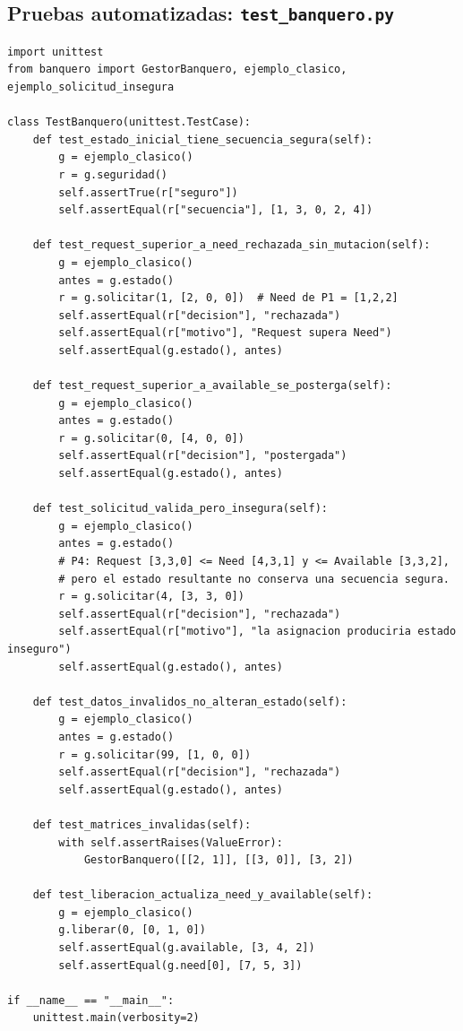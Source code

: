 \documentclass[12pt,a4paper]{article}
\begin{document}
\subsection{Pruebas automatizadas: \texttt{test\_banquero.py}}
\begin{lstlisting}[style=pycode]
import unittest
from banquero import GestorBanquero, ejemplo_clasico, ejemplo_solicitud_insegura

class TestBanquero(unittest.TestCase):
    def test_estado_inicial_tiene_secuencia_segura(self):
        g = ejemplo_clasico()
        r = g.seguridad()
        self.assertTrue(r["seguro"])
        self.assertEqual(r["secuencia"], [1, 3, 0, 2, 4])

    def test_request_superior_a_need_rechazada_sin_mutacion(self):
        g = ejemplo_clasico()
        antes = g.estado()
        r = g.solicitar(1, [2, 0, 0])  # Need de P1 = [1,2,2]
        self.assertEqual(r["decision"], "rechazada")
        self.assertEqual(r["motivo"], "Request supera Need")
        self.assertEqual(g.estado(), antes)

    def test_request_superior_a_available_se_posterga(self):
        g = ejemplo_clasico()
        antes = g.estado()
        r = g.solicitar(0, [4, 0, 0])
        self.assertEqual(r["decision"], "postergada")
        self.assertEqual(g.estado(), antes)

    def test_solicitud_valida_pero_insegura(self):
        g = ejemplo_clasico()
        antes = g.estado()
        # P4: Request [3,3,0] <= Need [4,3,1] y <= Available [3,3,2],
        # pero el estado resultante no conserva una secuencia segura.
        r = g.solicitar(4, [3, 3, 0])
        self.assertEqual(r["decision"], "rechazada")
        self.assertEqual(r["motivo"], "la asignacion produciria estado inseguro")
        self.assertEqual(g.estado(), antes)

    def test_datos_invalidos_no_alteran_estado(self):
        g = ejemplo_clasico()
        antes = g.estado()
        r = g.solicitar(99, [1, 0, 0])
        self.assertEqual(r["decision"], "rechazada")
        self.assertEqual(g.estado(), antes)

    def test_matrices_invalidas(self):
        with self.assertRaises(ValueError):
            GestorBanquero([[2, 1]], [[3, 0]], [3, 2])

    def test_liberacion_actualiza_need_y_available(self):
        g = ejemplo_clasico()
        g.liberar(0, [0, 1, 0])
        self.assertEqual(g.available, [3, 4, 2])
        self.assertEqual(g.need[0], [7, 5, 3])

if __name__ == "__main__":
    unittest.main(verbosity=2)

\end{lstlisting}
\end{document}
